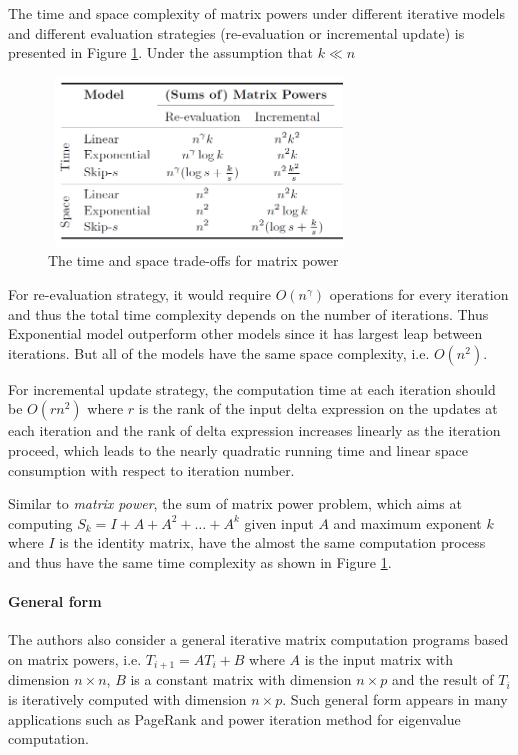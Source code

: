 The time and space complexity of matrix powers under different iterative models and different evaluation strategies (re-evaluation or incremental update) is presented in Figure \ref{fig:time_space_complexity_matrix_power}. Under the assumption that $k \ll n$ 

\begin{figure}
    \centering
    \includegraphics[width=8cm, height=4.5cm]{Figures/time_space_complexity_matrix_powers.png}
    \caption{The time and space trade-offs for matrix power}
    \label{fig:time_space_complexity_matrix_power}
\end{figure}

For re-evaluation strategy, it would require $O(n^{\gamma})$ operations for every iteration and thus the total time complexity depends on the number of iterations. Thus Exponential model outperform other models since it has largest leap between iterations. But all of the models have the same space complexity, i.e. $O(n^2)$.

For incremental update strategy, the computation time at each iteration should be $O(rn^2)$ where $r$ is the rank of the input delta expression on the updates at each iteration and the rank of delta expression increases linearly as the iteration proceed, which leads to the nearly quadratic running time and linear space consumption with respect to iteration number.

Similar to {\em matrix power}, the sum of matrix power problem, which aims at computing $S_k = I + A + A^2 + \dots + A^k$ given input $A$ and maximum exponent $k$ where $I$ is the identity matrix, have the almost the same computation process and thus have the same time complexity as shown in Figure \ref{fig:time_space_complexity_matrix_power}. 

\paragraph{General form} The authors also consider a general iterative matrix computation programs based on matrix powers, i.e. $T_{i+1} = AT_{i} + B$ where $A$ is the input matrix with dimension $n \times n$, $B$ is a constant matrix with dimension $n \times p$ and the result of $T_{i}$ is iteratively computed with dimension $n \times p$. Such general form appears in many applications such as PageRank and power iteration method for eigenvalue computation. 

